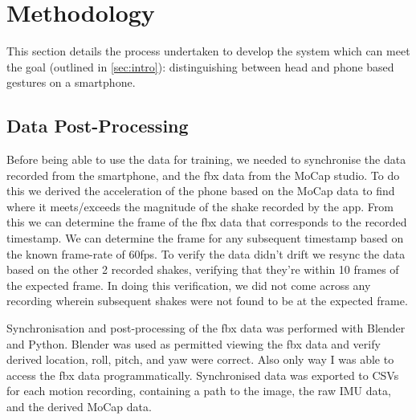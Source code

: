 \section{Methodology} %



This section details the process undertaken to develop the system which can meet the goal (outlined in \autoref{sec:intro}): distinguishing between head and phone based gestures on a smartphone.




\subsection{Data Post-Processing}
Before being able to use the data for training, we needed to synchronise the data recorded from the smartphone, and the fbx data from the MoCap studio.
To do this we derived the acceleration of the phone based on the MoCap data to find where it meets/exceeds the magnitude of the shake recorded by the app. From this we can determine the frame of the fbx data that corresponds to the recorded timestamp. We can determine the frame for any subsequent timestamp based on the known frame-rate of 60fps. 
To verify the data didn't drift we resync the data based on the other 2 recorded shakes, verifying that they're within 10 frames of the expected frame. In doing this verification, we did not come across any recording wherein subsequent shakes were not found to be at the expected frame.

Synchronisation and post-processing of the fbx data was performed with Blender and Python.
Blender was used as permitted viewing the fbx data and verify derived location, roll, pitch, and yaw were correct. Also only way I was able to access the fbx data programmatically.
Synchronised data was exported to CSVs for each motion recording, containing a path to the image, the raw IMU data, and the derived MoCap data.

